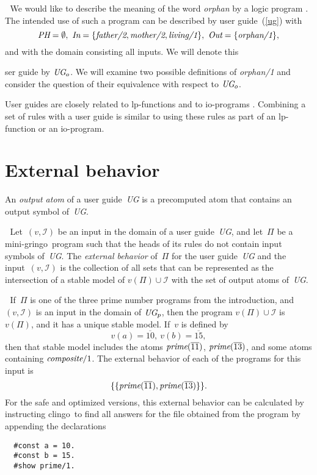 \documentclass{article}
\def\gringo{{\sc gringo}}
\def\clingo{{\sc clingo}}
\def\num{\overline}
\newcommand{\I}{\mathcal{I}}
\begin{document}
\medskip{}$\;$ We would like to describe the meaning
of the word \emph{orphan} by a logic program \cite[Section ??]{gel14}.
The intended use of such a
program can be described by user guide~(\ref{ug}) with
$$\emph{PH} = \emptyset,\
\emph{In} = \{\emph{father/2},\emph{mother/2}, \emph{living/1}\},\
\emph{Out} = \{\emph{orphan/1}\},$$
and with the domain consisting all inputs.    We will denote this
{ser guide by $\emph{UG}_o$.  We will examine
two possible definitions of \emph{orphan/1} and consider the question of their
equivalence with respect to $\emph{UG}_o$.
\medskip

User guides are closely related to
lp-functions \cite[Section~2]{gel02}
    and to io-programs \cite[Section~5]{fan20}.
    Combining a set of rules with a user guide is similar to using these
    rules as part of
    an lp-function or an io-program.

\section{External behavior}

    An \emph{output atom} of a user guide~\emph{UG} is a precomputed atom
    that contains an output symbol of~\emph{UG}.
    
    \medskip{}$\;$
    Let~$(v,\I)$ be an input in the domain
    of a user guide~\emph{UG}, and let~$\Pi$ be
a mini-\gringo\ program such that the heads of its rules do not
contain input symbols of~\emph{UG}.  The \emph{external behavior} of~$\Pi$
for the user guide~\emph{UG} and the input~$(v,\I)$ is the collection
of all sets that can be represented as the intersection of a stable model
of $v(\Pi)\cup\I$ with the set of output atoms of~\emph{UG}.

\medskip{}$\;$ If~$\Pi$ is one of the
three prime number programs from the introduction, and $(v,\I)$ is an
input in the domain of $\emph{UG}_p$, then the program $v(\Pi)\cup\I$
is $v(\Pi)$, and it has a unique stable model.  If~$v$ is defined by
$$v(a)=\num{10},\ v(b)=\num{15},$$
then that stable model includes the atoms $\emph{prime}(\num{11})$,
$\emph{prime}(\num{13})$, and some atoms containing
$\emph{composite}/1$.  The external behavior of each of the programs
for this input is
$$\{\{\emph{prime}(\num{11}),\emph{prime}(\num{13})\}\}.$$
For the safe and optimized versions, this external behavior
can be calculated by instructing \clingo\ to
find all answers for the file obtained from the program by appending the
declarations
\begin{verbatim}
  #const a = 10.
  #const b = 15.
  #show prime/1.
\end{verbatim}

}
\end{document}
